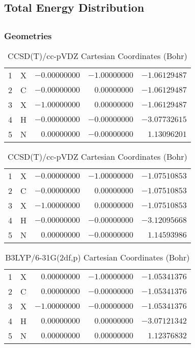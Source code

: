 \documentclass[10pt,oneside]{article}
\begin{document}
\begin{table}
\subsection*{Total Energy Distribution}
\centering\end{table}

\clearpage

\subsection{}

\begin{table}[h!]
\subsubsection*{Geometries}
\begin{multicols}{2}
\centering
\caption{CCSD(T)/cc-pVTZ Cartesian Coordinates (Bohr)}
\begin{tabular}{llrrr}
\toprule
1  & X  & $-0.00000000$ & $-1.00000000$ & $-1.06129487$ \\
2  & C  & $-0.00000000$ & $ 0.00000000$ & $-1.06129487$ \\
3  & X  & $-1.00000000$ & $ 0.00000000$ & $-1.06129487$ \\
4  & H  & $-0.00000000$ & $-0.00000000$ & $-3.07732615$ \\
5  & N  & $ 0.00000000$ & $-0.00000000$ & $ 1.13096201$ \\
\bottomrule
\end{tabular}
\caption{CCSD(T)/cc-pVDZ Cartesian Coordinates (Bohr)}
\begin{tabular}{llrrr}
\toprule
1  & X  & $-0.00000000$ & $-1.00000000$ & $-1.07510853$ \\
2  & C  & $-0.00000000$ & $ 0.00000000$ & $-1.07510853$ \\
3  & X  & $-1.00000000$ & $ 0.00000000$ & $-1.07510853$ \\
4  & H  & $-0.00000000$ & $-0.00000000$ & $-3.12095668$ \\
5  & N  & $ 0.00000000$ & $-0.00000000$ & $ 1.14593986$ \\
\bottomrule
\end{tabular}
\end{multicols}
\end{table}

\begin{table}[h]
\centering
\caption{B3LYP/6-31G(2df,p) Cartesian Coordinates (Bohr)}
\begin{tabular}{llrrr}
\toprule
1  & X  & $ 0.00000000$ & $-1.00000000$ & $-1.05341376$ \\
2  & C  & $ 0.00000000$ & $-0.00000000$ & $-1.05341376$ \\
3  & X  & $-1.00000000$ & $-0.00000000$ & $-1.05341376$ \\
4  & H  & $ 0.00000000$ & $ 0.00000000$ & $-3.07121342$ \\
5  & N  & $ 0.00000000$ & $ 0.00000000$ & $ 1.12376832$ \\
\bottomrule
\end{tabular}
\end{table}
\end{document}
